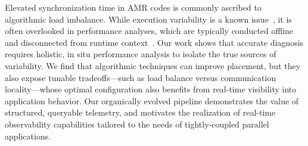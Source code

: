 Elevated synchronization time in AMR codes is commonly ascribed to algorithmic load imbalance.
While execution variability is a known
issue~\cite{Petri2003:Missing,Hoefl2010:Noise,Gunaw2018:FailSlow,Gangi2024:RDMA,Acun2016:Variation,Acun2016:Mitigating,Yildi2016:IONoise},
it is often overlooked in performance analyses, which are typically conducted offline and
disconnected from runtime context~\cite{Klenk2017:OverviewMPICharacteristics}.
Our work shows that accurate diagnosis requires holistic, in situ performance analysis to isolate
the true sources of variability.
We find that algorithmic techniques can improve placement, but they also expose tunable
tradeoffs---such as load balance versus communication locality---whose optimal configuration also
benefits from real-time visibility into application behavior.
Our organically evolved pipeline demonstrates the value of structured, queryable telemetry, and
motivates the realization of real-time observability capabilities tailored to the needs of
tightly-coupled parallel applications.



\newpage